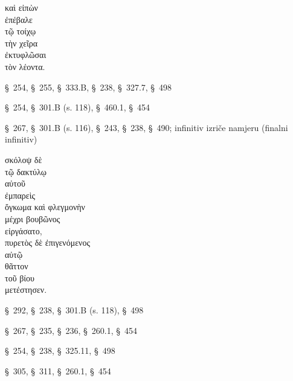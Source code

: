 

{\large
\begin{greek}
\noindent καὶ εἰπὼν \\
ἐπέβαλε \\
\tabto{2em} τῷ τοίχῳ \\
\tabto{2em} τὴν χεῖρα \\
\tabto{2em} ἐκτυφλῶσαι \\
\tabto{4em} τὸν λέοντα.\\

\end{greek}
}

\begin{description}[noitemsep]
\item[εἰπὼν] §~254, §~255, §~333.B, §~238, §~327.7, §~498
\item[ἐπέβαλε] §~254, §~301.B (s. 118), §~460.1, §~454
\item[ἐκτυφλῶσαι] §~267, §~301.B (s. 116), §~243, §~238, §~490; infinitiv izriče namjeru (finalni infinitiv)%
\end{description}



{\large
\begin{greek}
\noindent σκόλοψ δὲ \\
\tabto{2em} τῷ δακτύλῳ \\
\tabto{4em} αὐτοῦ \\
ἐμπαρεὶς \\
ὄγκωμα καὶ φλεγμονὴν \\
\tabto{2em} μέχρι βουβῶνος \\
εἰργάσατο, \\
πυρετὸς δὲ ἐπιγενόμενος \\
\tabto{2em} αὐτῷ \\
θᾶττον \\
\tabto{2em} τοῦ βίου \\
μετέστησεν.\\

\end{greek}
}

\begin{description}[noitemsep]
\item[ἐμπαρεὶς] §~292, §~238, §~301.B (s. 118), §~498
\item[εἰργάσατο] §~267, §~235, §~236, §~260.1, §~454
\item[ἐπιγενόμενος] §~254, §~238, §~325.11, §~498
\item[μετέστησεν] §~305, §~311, §~260.1, §~454

\end{description}


